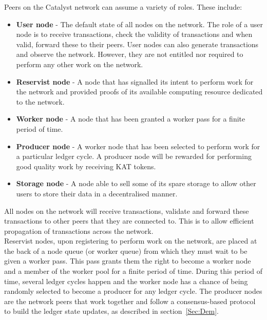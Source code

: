Peers on the Catalyst network can assume a variety of roles. These include:

\begin{itemize}

\item \textbf{User node} - The default state of all nodes on the network. The role of a user node is to receive transactions, check the  validity of transactions and when valid, forward these to their peers. User nodes can also generate transactions and observe the network. However, they are not entitled nor required to perform any other work on the network. 

\item \textbf{Reservist node} - A node that has signalled its intent to perform work for the network and provided proofs of its available computing resource dedicated to the network.

\item \textbf{Worker node} - A node that has been granted a worker pass for a finite period of time. 

\item \textbf{Producer node} - A worker node that has been selected to perform work for a particular ledger cycle. A producer node will be rewarded for performing good quality work by receiving KAT tokens. 

\item \textbf{Storage node} - A node able to sell some of its spare storage to allow other users to store their data in a decentralised manner. 

\end{itemize}

All nodes on the network will receive transactions, validate and forward these transactions to other peers that they are connected to. This is to allow efficient propagation of transactions across the network. \\

Reservist nodes, upon registering to perform work on the network, are placed at the back of a node queue (or worker queue) from which they must wait to be given a worker pass. This pass grants them the right to become a worker node and a member of the worker pool for a finite period of time. During this period of time, several ledger cycles happen and the worker node has a chance of being randomly selected to become a producer for any ledger cycle. The producer nodes are the network peers that work together and follow a consensus-based protocol to build the ledger state updates, as described in section~\ref{Sec:Dem}. 